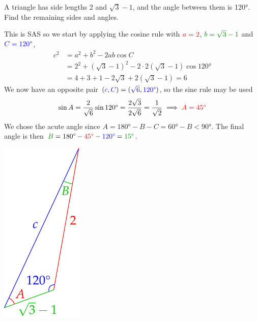 \begin{examples}{}{}
\exstart A triangle has side lengths 2 and $\sqrt 3-1$, and the angle between them is \ang{120}. Find the remaining sides and angles.\par
\begin{enumerate}\setcounter{enumi}{1}
\begin{minipage}[t]{0.79\linewidth}\vspace{-10pt}
\item[]This is SAS so we start by applying the cosine rule with $\textcolor{red}{a=2}$, $\textcolor{Green}{b=\sqrt 3-1}$ and $\textcolor{blue}{C=\ang{120}}$,
    \begin{align*}
    c^2&=a^2+b^2-2ab\cos C\\
    &=2^2+(\sqrt 3-1)^2-2\cdot 2(\sqrt 3-1)\cos\ang{120} \\
    &=4+3+1-2\sqrt 3+2(\sqrt 3-1) =6
    \end{align*}
  We now have an opposite pair $(\textcolor{blue}{c},\textcolor{blue}{C})=(\textcolor{blue}{\sqrt 6},\textcolor{blue}{\ang{120}})$, so the sine rule may be used
    \[\sin A=\frac 2{\sqrt 6}\sin\ang{120}=\frac{2\sqrt 3}{2\sqrt 6}=\frac 1{\sqrt 2}\implies \textcolor{red}{A=\ang{45}}\]
  We chose the acute angle since $A=\ang{180}-B-C=\ang{60}-B<\ang{90}$.\smallbreak
  The final angle is then $\textcolor{Green}{B}=\ang{180}-\textcolor{red}{\ang{45}}-\textcolor{blue}{\ang{120}}=\textcolor{Green}{\ang{15}}$.
\end{minipage}\hfill
\begin{minipage}[t]{0.2\linewidth}\vspace{-8pt}
\flushright\includegraphics{exsas}
\end{minipage}


\end{enumerate}
\end{examples}
